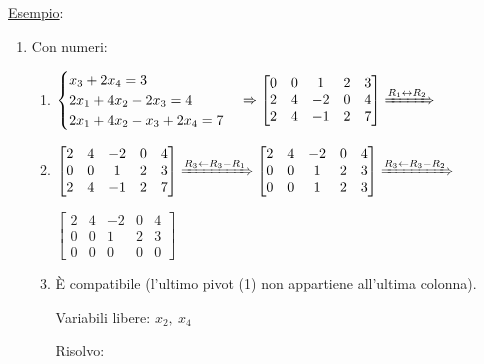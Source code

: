 \documentclass{article}
\newcommand{\ul}[1]{\underline{#1}}
\begin{document}
	\ul{Esempio}:
	\begin{enumerate}
		\item Con numeri:
		      \begin{enumerate}
			      \item $\begin{cases}
					            x_3+2x_4=3       \\
					            2x_1+4x_2-2x_3=4 \\
					            2x_1+4x_2-x_3+2x_4=7
				            \end{cases}\Rightarrow
				            \begin{bmatrix}
					            0 & 0 & 1  & 2 & 3 \\
					            2 & 4 & -2 & 0 & 4 \\
					            2 & 4 & -1 & 2 & 7
				            \end{bmatrix}\xRightarrow{R_1\leftrightarrow R_2}$

			      \item $\begin{bmatrix}
					            2 & 4 & -2 & 0 & 4 \\
					            0 & 0 & 1  & 2 & 3 \\
					            2 & 4 & -1 & 2 & 7
				            \end{bmatrix}\xRightarrow{R_3\leftarrow R_3-R_1}
				            \begin{bmatrix}
					            2 & 4 & -2 & 0 & 4 \\
					            0 & 0 & 1  & 2 & 3 \\
					            0 & 0 & 1  & 2 & 3
				            \end{bmatrix}\xRightarrow{R_3\leftarrow R_3-R_2}$

			            $\begin{bmatrix}
					            2 & 4 & -2 & 0 & 4 \\
					            0 & 0 & 1  & 2 & 3 \\
					            0 & 0 & 0  & 0 & 0
				            \end{bmatrix}$
			      \item È compatibile (l'ultimo pivot (1) non appartiene all'ultima colonna).

			            Variabili libere: $x_2,\ x_4$

			            Risolvo:


\end{enumerate}
\end{enumerate}
\end{document}
